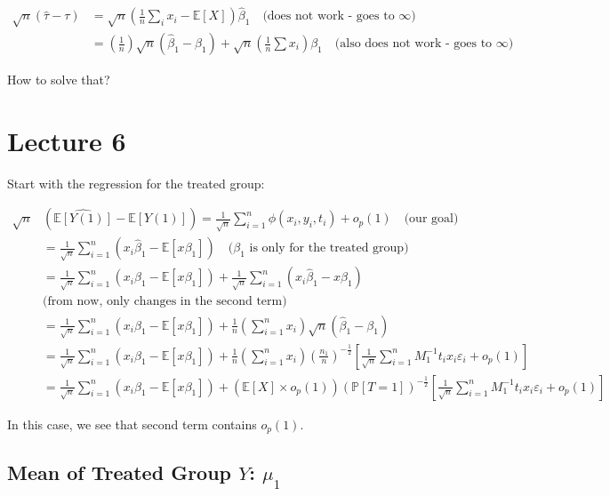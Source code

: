 \documentclass{article}
\begin{document}
\begin{align*}
    \sqrt{n} (\hat{\tau} - \tau)
    &= \sqrt{n} \left(\frac{1}{n} \sum_i x_i - \mathbb{E}[X]\right) \hat{\beta}_1 \quad \text{(does not work - goes to $\infty$)} \\
    &= \left( \frac{1}{n} \right) \sqrt{n} (\hat{\beta}_1 - \beta_1) + \sqrt{n} \left( \frac{1}{n} \sum x_i \right) \beta_1 \quad \text{(also does not work - goes to $\infty$)}
\end{align*}

How to solve that?

\section{Lecture 6}

Start with the regression for the treated group:

\begin{align*}
    \sqrt{n} & (\hat{\mathbb{E}[Y(1)]} - \mathbb{E}[Y(1)])
    = \frac{1}{\sqrt{n}} \sum_{i=1}^{n} \phi (x_i, y_i, t_i) + o_p(1) \quad \text{(our goal)}\\
    &= \frac{1}{\sqrt{n}} \sum_{i=1}^{n} (x_i \hat{\beta}_1 - \mathbb{E}[x \beta_1])  \quad \text{($\beta_1$ is only for the treated group)} \\
    &= \frac{1}{\sqrt{n}} \sum_{i=1}^{n} (x_i \beta_1 - \mathbb{E}[x \beta_1])
    + \frac{1}{\sqrt{n}} \sum_{i=1}^{n} (x_i \hat{\beta}_1 - x \beta_1) 
    \\
    & \text{(from now, only changes in the second term)} \\
    &= \frac{1}{\sqrt{n}} \sum_{i=1}^{n} (x_i \beta_1 - \mathbb{E}[x \beta_1])
    + \frac{1}{n} \left(\sum_{i=1}^{n} x_i\right) \sqrt{n} (\hat{\beta}_1 - \beta_1) \\
    &= \frac{1}{\sqrt{n}} \sum_{i=1}^{n} (x_i \beta_1 - \mathbb{E}[x \beta_1])
    + \frac{1}{n} \left(\sum_{i=1}^{n} x_i\right) \left( \frac{n_1}{n} \right)^{-\frac{1}{2}} \left[ \frac{1}{\sqrt{n}} \sum_{i=1}^n M_1^{-1} t_i x_i \varepsilon_i + o_p(1)\right] \\
    &= \frac{1}{\sqrt{n}} \sum_{i=1}^{n} (x_i \beta_1 - \mathbb{E}[x \beta_1])
    + \left( \mathbb{E}[X] \times o_p(1) \right) \left( \mathbb{P}[T=1] \right)^{-\frac{1}{2}} \left[ \frac{1}{\sqrt{n}} \sum_{i=1}^n M_1^{-1} t_i x_i \varepsilon_i + o_p(1)\right]
\end{align*}

In this case, we see that second term contains $o_p(1)$.

\subsection{Mean of Treated Group $Y$: $\mu_1$}
\end{document}
